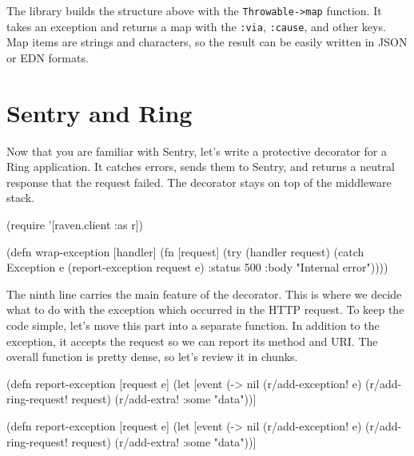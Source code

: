 
The library builds the structure above with the \texttt{Throw\-able->map} function. It takes an exception and returns a map with the \verb|:via|, \verb|:cause|, and other keys. Map items are strings and characters, so the result can be easily written in JSON or EDN formats.

\section{Sentry and Ring}


Now that you are familiar with Sentry, let's write a protective decorator for a Ring application. It catches errors, sends them to Sentry, and returns a neutral response that the request failed. The decorator stays on top of the middleware stack.

\begin{english}
  \begin{clojure/lines}
(require '[raven.client :as r])

(defn wrap-exception
  [handler]
  (fn [request]
    (try
      (handler request)
      (catch Exception e
        (report-exception request e)
        {:status 500
         :body "Internal error"}))))
  \end{clojure/lines}
\end{english}

The ninth line carries the main feature of the decorator. This is where we decide what to do with the exception which occurred in the HTTP request. To keep the code simple, let's move this part into a separate function. In addition to the exception, it accepts the request so we can report its method and URI. The overall function is pretty dense, so let's review it in chunks.

\ifnarrow

\begin{english}
  \begin{clojure/lines}
(defn report-exception [request e]
 (let
   [event
    (-> nil
     (r/add-exception! e)
     (r/add-ring-request! request)
     (r/add-extra! {:some "data"}))]
  \end{clojure/lines}
\end{english}

\else

\begin{english}
  \begin{clojure/lines}
(defn report-exception [request e]
  (let [event (-> nil
                  (r/add-exception! e)
                  (r/add-ring-request! request)
                  (r/add-extra! {:some "data"}))]
  \end{clojure/lines}
\end{english}

